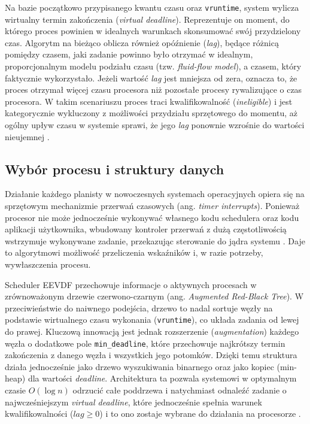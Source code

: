 Na bazie początkowo przypisanego kwantu czasu oraz \texttt{vruntime}, system wylicza wirtualny termin zakończenia (\textit{virtual deadline}). Reprezentuje on moment, do którego proces powinien w idealnych warunkach skonsumować swój przydzielony czas. Algorytm na bieżąco oblicza również opóźnienie (\textit{lag}), będące różnicą pomiędzy czasem, jaki zadanie powinno było otrzymać w idealnym, proporcjonalnym modelu podziału czasu (tzw. \textit{fluid-flow model}), a czasem, który faktycznie wykorzystało. Jeżeli wartość \textit{lag} jest mniejsza od zera, oznacza to, że proces otrzymał więcej czasu procesora niż pozostałe procesy rywalizujące o czas procesora. W takim scenariuszu proces traci kwalifikowalność (\textit{ineligible}) i jest kategorycznie wykluczony z możliwości przydziału sprzętowego do momentu, aż ogólny upływ czasu w systemie sprawi, że jego \textit{lag} ponownie wzrośnie do wartości nieujemnej \cite{linuxdocEEVDF, stoica1995eevdf}.

\subsection{Wybór procesu i struktury danych}
Działanie każdego planisty w nowoczesnych systemach operacyjnych opiera się na sprzętowym mechanizmie przerwań czasowych (ang. \textit{timer interrupts}). Ponieważ procesor nie może jednocześnie wykonywać własnego kodu schedulera oraz kodu aplikacji użytkownika, wbudowany kontroler przerwań z dużą częstotliwością wstrzymuje wykonywane zadanie, przekazując sterowanie do jądra systemu \cite{wikiScheduling}. Daje to algorytmowi możliwość przeliczenia wskaźników i, w razie potrzeby, wywłaszczenia procesu.

Scheduler EEVDF przechowuje informacje o aktywnych procesach w zrównoważonym drzewie czerwono-czarnym (ang. \textit{Augmented Red-Black Tree}). W przeciwieństwie do naiwnego podejścia, drzewo to nadal sortuje węzły na podstawie wirtualnego czasu wykonania (\texttt{vruntime}), co układa zadania od lewej do prawej. Kluczową innowacją jest jednak rozszerzenie (\textit{augmentation}) każdego węzła o dodatkowe pole \texttt{min\_deadline}, które przechowuje najkrótszy termin zakończenia z danego węzła i wszystkich jego potomków. Dzięki temu struktura działa jednocześnie jako drzewo wyszukiwania binarnego oraz jako kopiec (min-heap) dla wartości \textit{deadline}. Architektura ta pozwala systemowi w optymalnym czasie $O(\log n)$ odrzucić całe poddrzewa i natychmiast odnaleźć zadanie o najwcześniejszym \textit{virtual deadline}, które jednocześnie spełnia warunek kwalifikowalności ($lag \ge 0$) i to ono zostaje wybrane do działania na procesorze \cite{kernelInternalsEEVDF, linuxFairC}.

